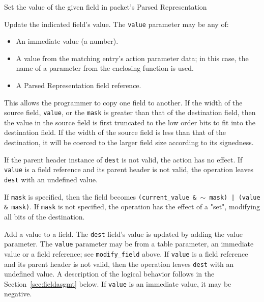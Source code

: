 \documentclass[12pt]{article}
\begin{document}
{ %
Set the value of the given field in packet's Parsed Representation
}
{ %
}
{ %
Update the indicated field's value. The \texttt{value} parameter may be any of:

\begin{itemize}
\item
An immediate value (a number).
\item
A value from the matching entry's action parameter data; in this case, the 
name of a parameter from the enclosing function is used.
\item
A Parsed Representation field reference.
\end{itemize}


This allows the programmer to copy one field to another. If the width of 
the source field, \texttt{value}, or the \texttt{mask} is greater than that of the destination 
field, then the value in the source field is first truncated to the low order 
bits to fit into the destination field. If the width of the source field 
is less than that of the destination, it will be coerced to the larger field 
size according to its signedness.

If the parent header instance of \texttt{dest} is not valid, the action has no effect. 
If \texttt{value} is a field reference and its parent header is not valid, the operation leaves \texttt{dest} with an undefined value.

If \texttt{mask} is specified, then the field becomes \texttt{(current_value \& $\sim$ mask) | 
(value \& mask)}.  If \texttt{mask} is not specified, the operation has the effect 
of a "set", modifying all bits of the destination. 

}


{ %
Add a value to a field.
}
{ %
}
{ %
The \texttt{dest} field's value is updated by adding the value parameter. The \texttt{value} parameter 
may be from a table parameter, an immediate value or a field reference; see \texttt{modify_field} above.  If \texttt{value} is a field reference 
and its parent header is not valid, then the operation leaves \texttt{dest} with an undefined value. A description
of the logical behavior follows in the Section~\ref{sec:fieldasgmt} below.
If \texttt{value} is an immediate value, it may 
be negative.
}
\end{document}
